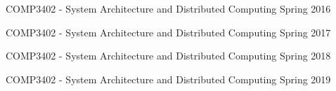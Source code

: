 


\begin{cvhonors}


\cvhonor
{COMP3402 - System Architecture and Distributed Computing} %
{Spring 2016} %

\cvhonor
{COMP3402 - System Architecture and Distributed Computing} %
{Spring 2017} %

\cvhonor
{COMP3402 - System Architecture and Distributed Computing} %
{Spring 2018} %

\cvhonor
{COMP3402 - System Architecture and Distributed Computing} %
{Spring 2019} %


\end{cvhonors}